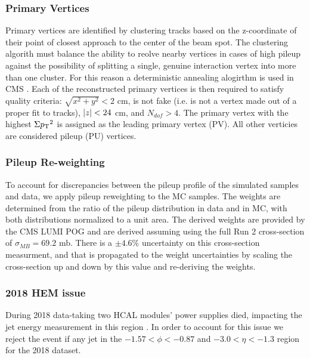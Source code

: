 \subsubsection{Primary Vertices}
Primary vertices are identified by clustering tracks based on the z-coordinate of their point of closest approach to the center of the beam spot. The clustering algorith must balance the ability to reolve nearby vertices in cases of high pileup against the possibility of splitting a single, genuine interaction vertex into more than one cluster. For this reason a deterministic annealing alogirthm is used in CMS \cite{trackPVCMS2014}. Each of the reconstructed primary vertices is then required to satisfy quality criteria: $\sqrt{x^2+y^2}<2$ cm, is not fake (i.e. is not a vertex made out of a proper fit to tracks), $\lvert z \rvert<24$ cm, and $N_{dof} > 4$.  The primary vertex with the highest $\Sigma{\ensuremath{p_{\mathrm{T}}}}^2$ is assigned as the leading primary vertex (PV). All other verticies are considered pileup (PU) vertices.
\subsubsection{Pileup Re-weighting}\label{PUSF}
To account for discrepancies between the pileup profile of the simulated samples and data, we apply pileup reweighting to the MC samples. The weights are determined from the ratio of the pileup distribution in data and in MC, with both distributions normalized to a unit area. The derived weights are provided by the CMS LUMI POG \cite{PUSFgithub} and are derived assuming using the full Run 2 cross-section of $\sigma_{MB}=69.2$ mb. There is a $\pm 4.6\% $ uncertainty \cite{LUMIPOGtwiki} on this cross-section measurment, and that is propagated to the weight uncertainties by scaling the cross-section up and down by this value and re-deriving the weights.
\subsubsection{2018 HEM issue}
During 2018 data-taking two HCAL modules' power supplies died, impacting the jet energy measurement in this region \cite{HEM}. In order to account for this issue we reject the event if any jet
 in the $-1.57 < \phi < -0.87$ and $-3.0 < \eta < -1.3$ region for the 2018 dataset.

